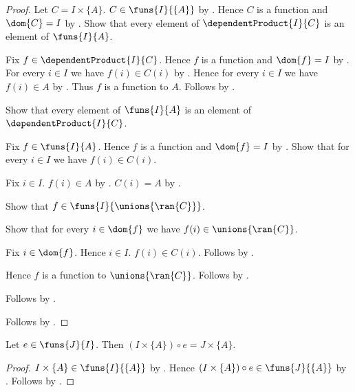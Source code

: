 \begin{proof}
    Let $C=I\times\{A\}$.
    $C\in\funs{I}{\{A\}}$ by .
    Hence $C$ is a function and $\dom{C}=I$ by
        .
    Show that every element of $\dependentProduct{I}{C}$ is an element
        of $\funs{I}{A}$.
    \begin{subproof}
        Fix $f\in\dependentProduct{I}{C}$.
        Hence $f$ is a function and $\dom{f}=I$ by
            .
        For every $i\in I$ we have $f(i)\in C(i)$ by
            .
        Hence for every $i\in I$ we have $f(i)\in A$ by
            .
        Thus $f$ is a function to $A$.
        Follows by .
    \end{subproof}
    Show that every element of $\funs{I}{A}$ is an element of
        $\dependentProduct{I}{C}$.
    \begin{subproof}
        Fix $f\in\funs{I}{A}$.
        Hence $f$ is a function and $\dom{f}=I$ by
            .
        Show that for every $i\in I$ we have $f(i)\in C(i)$.
        \begin{subproof}
            Fix $i\in I$.
            $f(i)\in A$ by .
            $C(i)=A$ by .
        \end{subproof}
        Show that $f\in\funs{I}{\unions{\ran{C}}}$.
        \begin{subproof}
            Show that for every $i\in\dom{f}$ we have
                $f(i)\in\unions{\ran{C}}$.
            \begin{subproof}
                Fix $i\in\dom{f}$.
                Hence $i\in I$.
                $f(i)\in C(i)$.
                Follows by .
            \end{subproof}
            Hence $f$ is a function to $\unions{\ran{C}}$.
            Follows by .
        \end{subproof}
        Follows by .
    \end{subproof}
    Follows by .
\end{proof}

\begin{proposition}\label{constant_family_precomposition}
    Let $e\in\funs{J}{I}$.
    Then $(I\times\{A\})\circ e=J\times\{A\}$.
\end{proposition}
\begin{proof}
    $I\times\{A\}\in\funs{I}{\{A\}}$ by .
    Hence $(I\times\{A\})\circ e\in\funs{J}{\{A\}}$ by .
    Follows by .
\end{proof}

